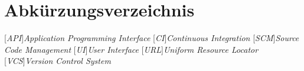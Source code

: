\chapter{Abkürzungsverzeichnis}

\begin{acronym}

[\textit{API}]{\textit{Application Programming Interface}}
[\textit{CI}]{\textit{Continuous Integration}}
[\textit{SCM}]{\textit{Source Code Management}}
[\textit{UI}]{\textit{User Interface}}
[\textit{URL}]{\textit{Uniform Resource Locator}}
[\textit{VCS}]{\textit{Version Control System}}
\end{acronym}